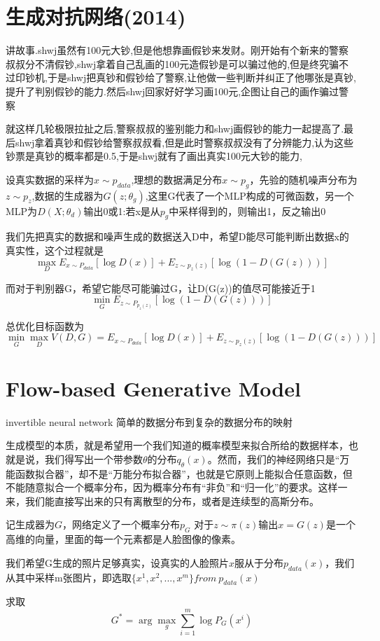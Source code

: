 \documentclass[12pt, a4paper, oneside]{ctexart}
\begin{document}
\section{生成对抗网络(2014)}
\par
讲故事.shwj虽然有100元大钞,但是他想靠画假钞来发财。刚开始有个新来的警察叔叔分不清假钞,shwj拿着自己乱画的100元造假钞是可以骗过他的,但是终究骗不过印钞机,于是shwj把真钞和假钞给了警察,让他做一些判断并纠正了他哪张是真钞,提升了判别假钞的能力.然后shwj回家好好学习画100元,企图让自己的画作骗过警察
\par
就这样几轮极限拉扯之后,警察叔叔的鉴别能力和shwj画假钞的能力一起提高了.最后shwj拿着真钞和假钞给警察叔叔看,但是此时警察叔叔没有了分辨能力,认为这些钞票是真钞的概率都是0.5,于是shwj就有了画出真实100元大钞的能力,
\par
设真实数据的采样为$x\sim p_{data}$,理想的数据满足分布$x\sim p_g$，先验的随机噪声分布为$z\sim p_z$,数据的生成器为$G(z;\theta_g)$,这里G代表了一个MLP构成的可微函数，另一个MLP为$D(X;\theta_d)$输出0或1:若x是从$p_g$中采样得到的，则输出1，反之输出0
\par
我们先把真实的数据和噪声生成的数据送入D中，希望D能尽可能判断出数据x的真实性，这个过程就是
$$\max\limits_{D}E_{x\sim P_{data}}[\log D(x)]+E_{z\sim p_z(z)}[\log(1-D(G(z)))]$$
\par
而对于判别器G，希望它能尽可能骗过G，让D(G(z))的值尽可能接近于1
$$\min\limits_{G}E_{z\sim P_{p_z(z)}}[\log(1-D(G(z)))]$$

\par 
总优化目标函数为$$\min\limits_{G}\max\limits_{D}V(D,G)=E_{x\sim P_{data}}[\log D(x)]+E_{z\sim p_z(z)}[\log(1-D(G(z)))]$$

\section{Flow-based Generative Model}
\par
invertible neural network 简单的数据分布到复杂的数据分布的映射
\par
生成模型的本质，就是希望用一个我们知道的概率模型来拟合所给的数据样本，也就是说，我们得写出一个带参数$\theta$的分布$q_{\theta}(x)$。然而，我们的神经网络只是“万能函数拟合器”，却不是“万能分布拟合器”，也就是它原则上能拟合任意函数，但不能随意拟合一个概率分布，因为概率分布有“非负”和“归一化”的要求。这样一来，我们能直接写出来的只有离散型的分布，或者是连续型的高斯分布。

\par
记生成器为$G$，网络定义了一个概率分布$p_G$ 对于$z\sim \pi(z)$输出$x=G(z)$是一个高维的向量，里面的每一个元素都是人脸图像的像素。
\par
我们希望G生成的照片足够真实，设真实的人脸照片$x$服从于分布$p_{data}(x)$，我们从其中采样m张图片，即选取$\{x^1,x^2,...,x^m\}from\ p_{data}(x)$
\par
求取$$G^*=\arg\max\limits_{g}{\sum_{i=1}^{m}{\log P_G(x^i)}}$$
\end{document}
